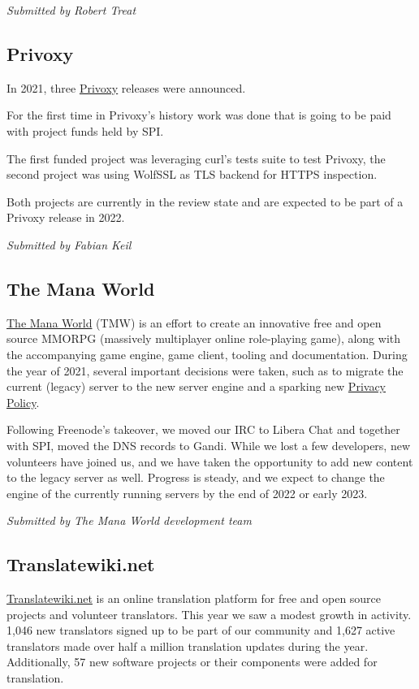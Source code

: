 \documentclass[a4paper]{report}
\begin{document}
{\em Submitted by Robert Treat}

\subsection{Privoxy}

In 2021, three \href{https://www.privoxy.org/}{Privoxy} releases were announced.

For the first time in Privoxy's history work was done that is going to be paid with project funds held by SPI.

The first funded project was leveraging curl's tests suite to test Privoxy, the second project was using WolfSSL as TLS backend for HTTPS inspection.

Both projects are currently in the review state and are expected to be part of a Privoxy release in 2022.

{\em Submitted by Fabian Keil}

\subsection{The Mana World}

\href{https://www.themanaworld.org/about}{The Mana World} (TMW) is an effort to create an innovative free and open source MMORPG (massively multiplayer online role-playing game), along with the accompanying game engine, game client, tooling and documentation. During the year of 2021, several important decisions were taken, such as to migrate the current (legacy) server to the new server engine and a sparking new \href{https://policies.themanaworld.org/privacy-policy}{Privacy Policy}.

Following Freenode's takeover, we moved our IRC to Libera Chat and together with SPI, moved the DNS records to Gandi. While we lost a few developers, new volunteers have joined us, and we have taken the opportunity to add new content to the legacy server as well. Progress is steady, and we expect to change the engine of the currently running servers by the end of 2022 or early 2023.

{\em Submitted by The Mana World development team}

\subsection{Translatewiki.net}

\href{https://translatewiki.net/}{Translatewiki.net} is an online translation platform for free and open source projects and volunteer translators. This year we saw a modest growth in activity. 1,046 new translators signed up to be part of our community and 1,627 active translators made over half a million translation updates during the year. Additionally, 57 new software projects or their components were added for translation.
\end{document}
